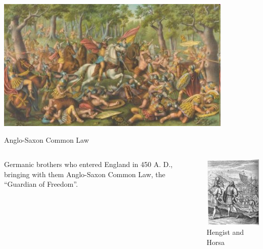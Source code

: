 \begin{frame}
    \centering
    \includegraphics[width=0.85\textwidth]{img/teutoburg.png} \\
\end{frame}

\begin{frame}{Anglo-Saxon Common Law}
    \begin{columns}[onlytextwidth]
            Germanic brothers who entered England in 450 A. D., bringing with them Anglo-Saxon Common Law, the ``Guardian of Freedom''.

            \centering
            \includegraphics[height=0.55\textheight]{img/hengist-horsa.png} \\
            Hengist and Horsa \\
    \end{columns}
\end{frame}

